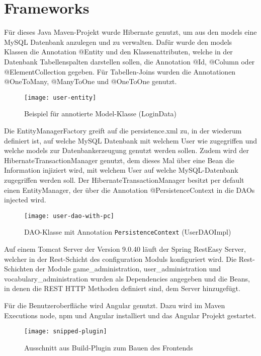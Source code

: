 \section{Frameworks}\label{sec:frameworks}

Für dieses Java Maven-Projekt wurde Hibernate genutzt, um aus den models
eine MySQL Datenbank anzulegen und zu verwalten.
Dafür wurde den models Klassen die Annotation @Entity und den Klassenattributen, welche
in der Datenbank Tabellenspalten darstellen sollen, die Annotation @Id, @Column oder @ElementCollection gegeben.
Für Tabellen-Joins wurden die Annotationen @OneToMany, @ManyToOne und @OneToOne genutzt.

\begin{figure}[H]
    \centering
    \texttt{[image: user-entity]}
    \caption[]{Beispiel für annotierte Model-Klasse (LoginData)}
    \label{fig:user-entity}
\end{figure}

Die EntityManagerFactory greift auf die persistence.xml zu, in der wiederum definiert ist, auf welche MySQL Datenbank mit welchem User wie zugegriffen
und welche models zur Datenbankerzeugung genutzt werden sollen.
Zudem wird der HibernateTransactionManager genutzt, dem dieses Mal über eine Bean die Information injiziert wird,
mit welchem User auf welche MySQL-Datenbank zugegriffen werden soll.
Der HibernateTransactionManager besitzt per default einen EntityManager, der
über die Annotation @PersistenceContext in die DAOs injected wird.

\begin{figure}[H]
    \centering
    \texttt{[image: user-dao-with-pc]}
    \caption[]{DAO-Klasse mit Annotation \texttt{PersistenceContext} (UserDAOImpl)}
    \label{fig:userdao}
\end{figure}

Auf einem Tomcat Server der Version 9.0.40 läuft der Spring RestEasy Server, welcher
in der Rest-Schicht des configuration Moduls konfiguriert wird.
Die Rest-Schichten der Module game\_administration, user\_administration und vocabulary\_administration
wurden als Dependencies angegeben und die Beans, in denen die REST HTTP Methoden definiert sind,
dem Server hinzugefügt.

Für die Benutzeroberfläche wird Angular genutzt.
Dazu wird im Maven Executions node, npm und Angular installiert und das Angular Projekt gestartet.

\begin{figure}[H]
    \centering
    \texttt{[image: snipped-plugin]}
    \caption[]{Ausschnitt aus Build-Plugin zum Bauen des Frontends}
    \label{fig:snippet}
\end{figure}

